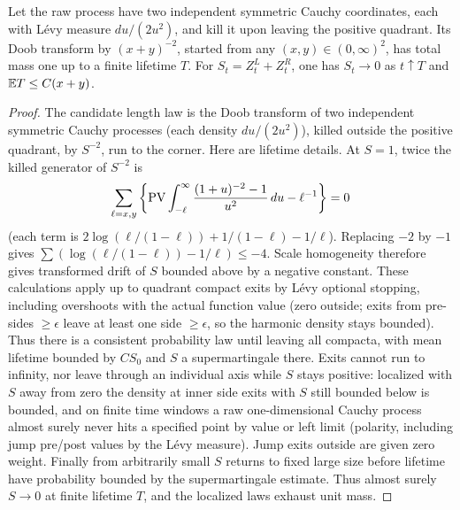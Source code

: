 \begin{lemma}\label{cut:lifetime}
Let the raw process have two independent symmetric Cauchy coordinates,
each with Lévy measure \(du/(2u^2)\), and kill it upon leaving the positive
quadrant.  Its Doob transform by \((x+y)^{-2}\), started from any
\((x,y)\in(0,\infty)^2\), has total mass one up to a finite lifetime \(T\).
For \(S_t=Z^L_t+Z^R_t\), one has \(S_t\to0\) as \(t\uparrow T\) and
\(\mathbb E T\le C(x+y)\).
\end{lemma}
\begin{proof}\leavevmode

The candidate length law is the Doob transform of two independent symmetric Cauchy processes (each density \(du/(2u^2)\)), killed outside the positive quadrant, by \(S^{-2}\), run to the corner. Here are lifetime details. At \(S=1\), twice the killed generator of \(S^{-2}\) is
\[
 \sum_{\ell=x,y}\left\{{\rm PV}\int_{-\ell}^\infty
 \frac{(1+u)^{-2}-1}{u^2}\,du-\ell^{-1}\right\}=0
\]
(each term is \(2\log(\ell/(1-\ell))+1/(1-\ell)-1/\ell\)).
Replacing \(-2\) by \(-1\) gives \(\sum(\log(\ell/(1-\ell))-1/\ell)\le-4\).
Scale homogeneity therefore gives transformed drift of \(S\) bounded above by a negative constant.
These calculations apply up to quadrant compact exits by Lévy optional stopping, including overshoots with the actual function value (zero outside; exits from pre-sides \(\ge\epsilon\) leave at least one side \(\ge\epsilon\), so the harmonic density stays bounded).
Thus there is a consistent probability law until leaving all compacta, with mean lifetime bounded by \(C S_0\) and \(S\) a supermartingale there.
Exits cannot run to infinity, nor leave through an individual axis while \(S\) stays positive: localized with \(S\) away from zero the density at inner side exits with \(S\) still bounded below is bounded, and on finite time windows a raw one-dimensional Cauchy process almost surely never hits a specified point by value or left limit (polarity, including jump pre/post values by the Lévy measure).
Jump exits outside are given zero weight.
Finally from arbitrarily small \(S\) returns to fixed large size before lifetime have probability bounded by the supermartingale estimate.
Thus almost surely \(S\to0\) at finite lifetime \(T\), and the localized laws exhaust unit mass.

\end{proof}

